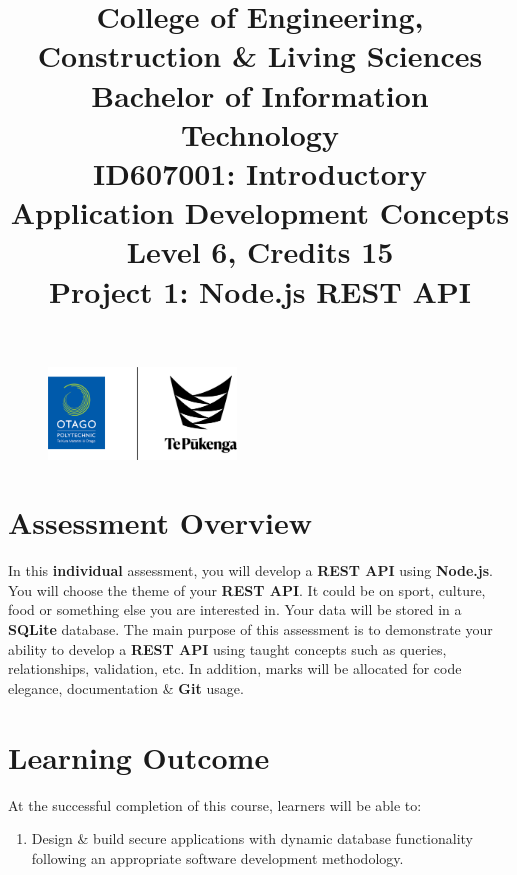 \documentclass{article}
\author{}
\begin{document}
\begin{figure}
	\centering
	\includegraphics[width=50mm]{../img/logo.png}
\end{figure}

\title{College of Engineering, Construction \& Living Sciences\\Bachelor of Information Technology\\ID607001: Introductory Application Development Concepts\\Level 6, Credits 15\\\textbf{Project 1: Node.js REST API}}
\date{}
\maketitle

\section*{Assessment Overview}
In this \textbf{individual} assessment, you will develop a \textbf{REST API} using \textbf{Node.js}. You will choose the theme of your \textbf{REST API}. It could be on sport, culture, food or something else you are interested in. Your data will be stored in a \textbf{SQLite} database. The main purpose of this assessment is to demonstrate your ability to develop a \textbf{REST API} using taught concepts such as queries, relationships, validation, etc. In addition, marks will be allocated for code elegance, documentation \& \textbf{Git} usage.

\section*{Learning Outcome}
At the successful completion of this course, learners will be able to:
\begin{enumerate}
	\item Design \& build secure applications with dynamic database functionality following an appropriate software development methodology.
\end{enumerate}
\end{document}
